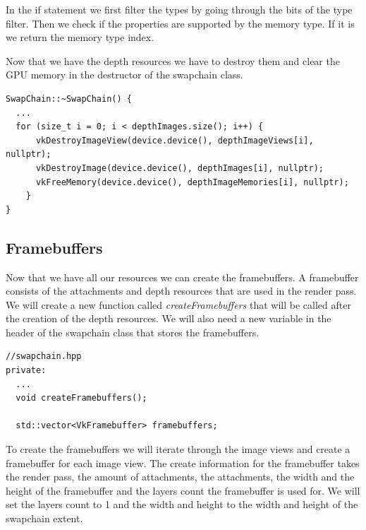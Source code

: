 \documentclass[12pt]{report} \usepackage{preamble}
\begin{document}
In the if statement we first filter the types by going through the bits of the type filter. Then we check if the
properties are supported by the memory type. If it is we return the memory type index.

Now that we have the depth resources we have to destroy them and clear the \ac{GPU} memory in the destructor of the swapchain class.

\begin{lstlisting}[Language=C++]
SwapChain::~SwapChain() {
  ...
  for (size_t i = 0; i < depthImages.size(); i++) {
      vkDestroyImageView(device.device(), depthImageViews[i], nullptr);
      vkDestroyImage(device.device(), depthImages[i], nullptr);
      vkFreeMemory(device.device(), depthImageMemories[i], nullptr);
    }
}
\end{lstlisting}

\subsection{Framebuffers}

Now that we have all our resources we can create the framebuffers. A framebuffer consists of the attachments and depth
resources that are used in the render pass. We will create a new function called \textit{createFramebuffers}
that will be called after the creation of the depth resources. We will also need a
new variable in the header of the swapchain class that stores the framebuffers.

\begin{lstlisting}[Language=C++]
//swapchain.hpp
private:
  ...
  void createFramebuffers();

  std::vector<VkFramebuffer> framebuffers;
\end{lstlisting}

To create the framebuffers we will iterate through the image views and create a framebuffer for each image view.
The create information for the framebuffer takes the render pass, the amount of attachments, the attachments, the width
and the height of the framebuffer and the layers count the framebuffer is used for. We will set the layers count to 1
and the width and height to the width and height of the swapchain extent.
\end{document}
